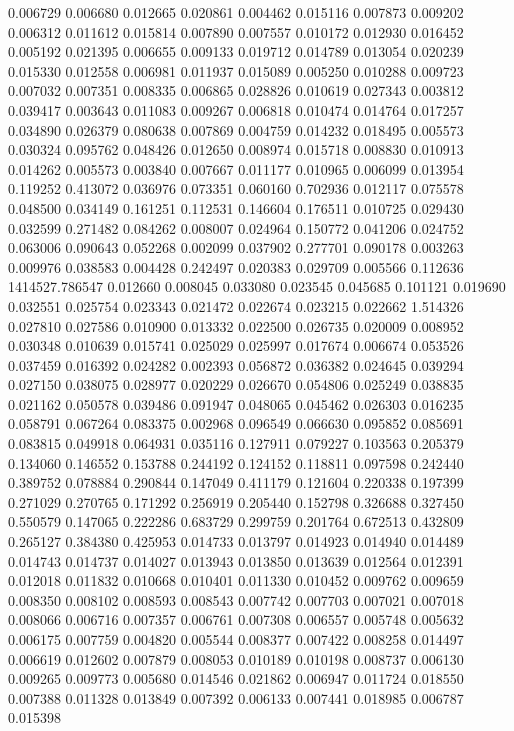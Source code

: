 0.006729
0.006680
0.012665
0.020861
0.004462
0.015116
0.007873
0.009202
0.006312
0.011612
0.015814
0.007890
0.007557
0.010172
0.012930
0.016452
0.005192
0.021395
0.006655
0.009133
0.019712
0.014789
0.013054
0.020239
0.015330
0.012558
0.006981
0.011937
0.015089
0.005250
0.010288
0.009723
0.007032
0.007351
0.008335
0.006865
0.028826
0.010619
0.027343
0.003812
0.039417
0.003643
0.011083
0.009267
0.006818
0.010474
0.014764
0.017257
0.034890
0.026379
0.080638
0.007869
0.004759
0.014232
0.018495
0.005573
0.030324
0.095762
0.048426
0.012650
0.008974
0.015718
0.008830
0.010913
0.014262
0.005573
0.003840
0.007667
0.011177
0.010965
0.006099
0.013954
0.119252
0.413072
0.036976
0.073351
0.060160
0.702936
0.012117
0.075578
0.048500
0.034149
0.161251
0.112531
0.146604
0.176511
0.010725
0.029430
0.032599
0.271482
0.084262
0.008007
0.024964
0.150772
0.041206
0.024752
0.063006
0.090643
0.052268
0.002099
0.037902
0.277701
0.090178
0.003263
0.009976
0.038583
0.004428
0.242497
0.020383
0.029709
0.005566
0.112636
1414527.786547
0.012660
0.008045
0.033080
0.023545
0.045685
0.101121
0.019690
0.032551
0.025754
0.023343
0.021472
0.022674
0.023215
0.022662
1.514326
0.027810
0.027586
0.010900
0.013332
0.022500
0.026735
0.020009
0.008952
0.030348
0.010639
0.015741
0.025029
0.025997
0.017674
0.006674
0.053526
0.037459
0.016392
0.024282
0.002393
0.056872
0.036382
0.024645
0.039294
0.027150
0.038075
0.028977
0.020229
0.026670
0.054806
0.025249
0.038835
0.021162
0.050578
0.039486
0.091947
0.048065
0.045462
0.026303
0.016235
0.058791
0.067264
0.083375
0.002968
0.096549
0.066630
0.095852
0.085691
0.083815
0.049918
0.064931
0.035116
0.127911
0.079227
0.103563
0.205379
0.134060
0.146552
0.153788
0.244192
0.124152
0.118811
0.097598
0.242440
0.389752
0.078884
0.290844
0.147049
0.411179
0.121604
0.220338
0.197399
0.271029
0.270765
0.171292
0.256919
0.205440
0.152798
0.326688
0.327450
0.550579
0.147065
0.222286
0.683729
0.299759
0.201764
0.672513
0.432809
0.265127
0.384380
0.425953
0.014733
0.013797
0.014923
0.014940
0.014489
0.014743
0.014737
0.014027
0.013943
0.013850
0.013639
0.012564
0.012391
0.012018
0.011832
0.010668
0.010401
0.011330
0.010452
0.009762
0.009659
0.008350
0.008102
0.008593
0.008543
0.007742
0.007703
0.007021
0.007018
0.008066
0.006716
0.007357
0.006761
0.007308
0.006557
0.005748
0.005632
0.006175
0.007759
0.004820
0.005544
0.008377
0.007422
0.008258
0.014497
0.006619
0.012602
0.007879
0.008053
0.010189
0.010198
0.008737
0.006130
0.009265
0.009773
0.005680
0.014546
0.021862
0.006947
0.011724
0.018550
0.007388
0.011328
0.013849
0.007392
0.006133
0.007441
0.018985
0.006787
0.015398
